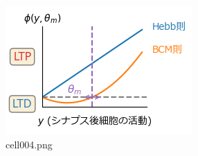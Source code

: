 \begin{figure}[ht]
	\centering
	\includegraphics[scale=0.8, max width=\linewidth]{./fig/local-learning-rule/pca-hebbian-learning/cell004.png}
	\caption{cell004.png}
	\label{cell004.png}
\end{figure}